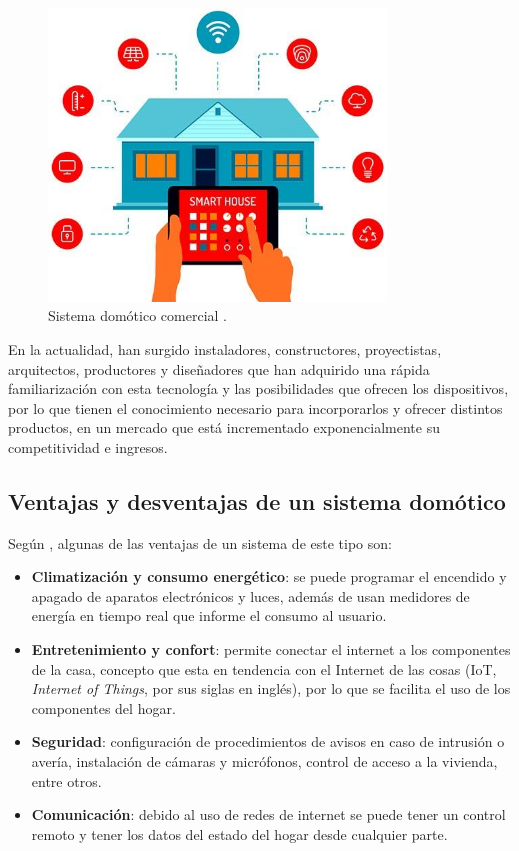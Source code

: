 \begin{figure}[H]
\centering
\includegraphics[width=0.8\textwidth]{./imagenes/teoria/domo.jpg} 
\caption{Sistema domótico comercial \cite{Madrid2007}.}
\label{F:domo}
\end{figure}

En la actualidad, han surgido instaladores, constructores, proyectistas, arquitectos, productores y diseñadores que han adquirido una rápida familiarización con esta tecnología  y las posibilidades que ofrecen los dispositivos, por lo que tienen el conocimiento necesario para incorporarlos y ofrecer distintos productos, en un mercado que está incrementado exponencialmente su competitividad e ingresos.
\subsection{Ventajas y desventajas de un sistema domótico}

Según \cite{Madrid2007}, algunas de las ventajas de un sistema de este tipo son:

\begin{itemize}
\item \textbf{Climatización y consumo energético}: se puede programar el encendido y apagado de aparatos electrónicos y luces, además de usan medidores de energía en tiempo real que informe el consumo al usuario.
\item \textbf{Entretenimiento y confort}: permite conectar el internet a los componentes de la casa, concepto que esta en tendencia con el Internet de las cosas (IoT, \textit{Internet of Things}, por sus siglas en inglés), por lo que se facilita el uso de los componentes del hogar.
\item \textbf{Seguridad}: configuración de procedimientos de avisos en caso de intrusión o avería, instalación de cámaras y micrófonos, control de acceso a la vivienda, entre otros.
\item \textbf{Comunicación}: debido al uso de redes de internet se puede tener un control remoto y tener los datos del estado del hogar desde cualquier parte.
\end{itemize}

